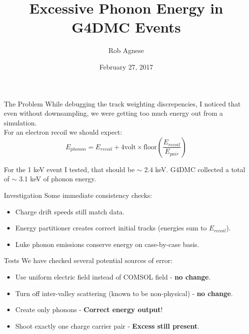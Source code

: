 \documentclass{beamer}
\title[G4DMC]{Excessive Phonon Energy in G4DMC Events}
\author{Rob Agnese}
\institute{University of Florida}
\date{February 27, 2017}
\begin{document}
\begin{frame}
    \titlepage{}
\end{frame}

\begin{frame}{The Problem}
    \vfill
    While debugging the track weighting discrepencies, I noticed that
    even without downsampling, we were getting too much energy out from a 
    simulation. \\

    For an electron recoil we should expect:
    \begin{equation}
        E_{phonon} = E_{recoil} + 4 \textrm{volt} \times 
        \textrm{floor}\left(\frac{E_{recoil}}{E_{pair}}\right)
    \end{equation}

    For the 1 keV event I tested, that should be $\sim$ 2.4 keV. G4DMC collected
    a total of $\sim$ 3.1 keV of phonon energy.
    \vfill
\end{frame}

\begin{frame}{Investigation}
    \vfill
    Some immediate consistency checks:
    \begin{itemize}
        \item Charge drift speeds still match data.
        \item Energy partitioner creates correct initial tracks (energies sum to $E_{recoil}$).
        \item Luke phonon emissions conserve energy on case-by-case basis.
    \end{itemize}
    \vfill
\end{frame}

\begin{frame}{Tests}
    \vfill
    We have checked several potential sources of error:
    \begin{itemize}
        \item Use uniform electric field instead of COMSOL field - \textbf{no change}.
        \item Turn off inter-valley scattering (known to be non-physical) - \textbf{no change}.
        \item Create only phonons - \textbf{Correct energy output}!
        \item Shoot exactly one charge carrier pair - \textbf{Excess still present}.
    \end{itemize}
    \vfill
\end{frame}
\end{document}
